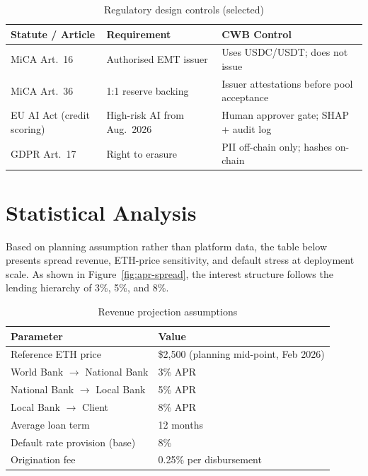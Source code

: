 \documentclass[12pt, a4paper]{report}
\newcommand{\tableheadcolor}{\rowcolor{TableHeadBg}}
\begin{document}
\begin{table}[H]
\centering
\caption[Regulatory design controls (selected)]{Regulatory design controls (selected)}
\label{tab:mica-mapping}
\begin{tabular}{p{3.2cm}p{4.6cm}p{5.8cm}}
\toprule
\tableheadcolor
\textbf{Statute / Article} & \textbf{Requirement} & \textbf{CWB Control} \\
\midrule
MiCA Art.~16 & Authorised EMT issuer & Uses USDC/USDT; does not issue \\
MiCA Art.~36 & 1{:}1 reserve backing & Issuer attestations before pool acceptance \\
EU AI Act (credit scoring) & High-risk AI from Aug.~2026~ & Human approver gate; SHAP + audit log \\
GDPR Art.~17 & Right to erasure & PII off-chain only; hashes on-chain \\
\bottomrule
\end{tabular}
\end{table}

\section{Statistical Analysis}
\label{sec:statistical-analysis}
\label{sec:interest-rates}

Based on planning assumption rather than platform data, the table below presents spread revenue, ETH-price sensitivity, and default stress at deployment scale. As shown in Figure~\ref{fig:apr-spread}, the interest structure follows the lending hierarchy of 3\%, 5\%, and 8\%.

\begin{table}[H]
\centering
\caption[Revenue projection assumptions]{Revenue projection assumptions}
\label{tab:revenue-assumptions}
\begin{tabular}{p{6cm}p{7.5cm}}
\toprule
\tableheadcolor
\textbf{Parameter} & \textbf{Value} \\
\midrule
Reference ETH price & \$2{,}500 (planning mid-point, Feb 2026) \\
World Bank $\to$ National Bank & 3\% APR \\
National Bank $\to$ Local Bank & 5\% APR \\
Local Bank $\to$ Client & 8\% APR \\
Average loan term & 12 months \\
Default rate provision (base) & 8\% \\
Origination fee & 0.25\% per disbursement \\
\bottomrule
\end{tabular}
\end{table}
\end{document}
